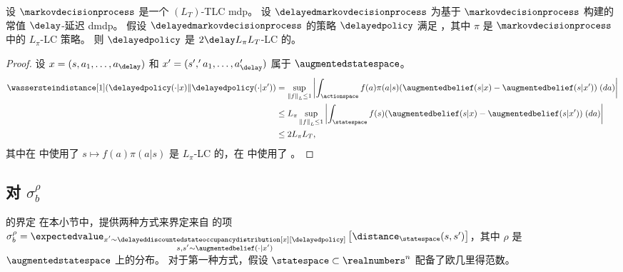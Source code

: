 \begin{prop}
\label{pp:lip_dida_pol}
    设 $\markovdecisionprocess$ 是一个 $(L_T)$-TLC \gls{mdp}。
    设 $\delayedmarkovdecisionprocess$ 为基于 $\markovdecisionprocess$ 构建的常值 $\delay$-延迟 \gls{dmdp}。
    假设 $\delayedmarkovdecisionprocess$ 的策略 $\delayedpolicy$ 满足 ，其中 $\pi$ 是 $\markovdecisionprocess$ 中的 $L_\pi$-LC 策略。
    则 $\delayedpolicy$ 是 $2\delay L_\pi L_T$-LC 的。
\end{prop}
\begin{proof}
    设 $x=(s,a_1,\dots,a_\delay)$ 和 $x'=(s','a_1,\dots,a_\delay')$ 属于 $\augmentedstatespace$。
    \begin{align}
        \wassersteindistance[1](\delayedpolicy(\cdot\vert x)\Vert \delayedpolicy(\cdot\vert x'))
        &= \sup_{\left\Vert f\right\Vert_L\leq 1} \left\vert \int_{\actionspace} f(a)\pi(a\vert s)(\augmentedbelief(s\vert x)-\augmentedbelief(s\vert x'))\; (da) \right\vert
        \nonumber\\
        &\le L_\pi\sup_{\left\Vert f\right\Vert_L\leq 1} \left\vert \int_{\statespace} f(s)(\augmentedbelief(s\vert x)-\augmentedbelief(s\vert x'))\; (da) \right\vert
        \label{eq:lpi_in_s}
        \\
        &\le 2 L_\pi L_T,
        \label{eq:lpilc}
    \end{align}
    其中在  中使用了 $s\mapsto f(a)\pi(a\vert s)$ 是 $L_\pi$-LC 的，在  中使用了 。
\end{proof}

\subsection{对 \texorpdfstring{$\sigma_b^{\rho}$}{}} 的界定
在本小节中，提供两种方式来界定来自  的项 $\textstyle\sigma_b^\rho = \expectedvalue_{\substack{x'\sim \delayeddiscountedstateoccupancydistribution[x][\delayedpolicy]\\ s,s'\sim \augmentedbelief(\cdot\vert x')}}\left[ \distance_{\statespace}(s,s') \right]$，其中 $\rho$ 是 $\augmentedstatespace$ 上的分布。
对于第一种方式，假设 $\statespace\subset\realnumbers^n$ 配备了欧几里得范数。

